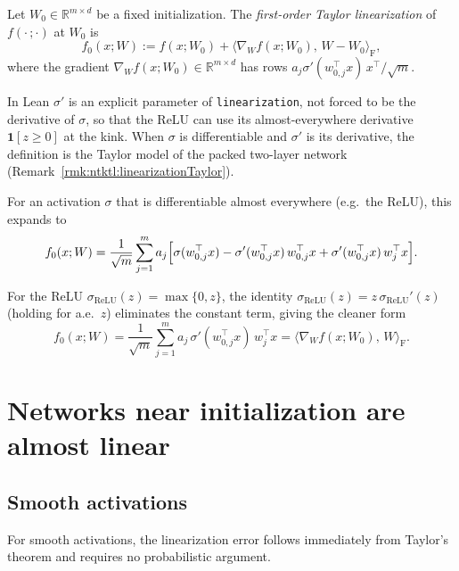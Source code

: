 \begin{definition}\label{def:ntk:linearization}
  \leanok
Let $W_0 \in \mathbb{R}^{m \times d}$ be a fixed initialization.
The \emph{first-order Taylor linearization} of $f(\cdot\,; \cdot)$ at $W_0$ is
\[
  f_0(x; W) :=
    f(x; W_0) + \langle \nabla_W f(x; W_0),\, W - W_0 \rangle_{\mathrm{F}},
\]
where the gradient $\nabla_W f(x; W_0) \in \mathbb{R}^{m \times d}$ has rows
$a_j \sigma'(w_{0,j}^\top x)\, x^\top / \sqrt{m}$.

In Lean $\sigma'$ is an explicit parameter of \texttt{linearization}, not forced to be the
derivative of $\sigma$, so that the ReLU can use its almost-everywhere derivative
$\mathbf 1[z \ge 0]$ at the kink. When $\sigma$ is differentiable and $\sigma'$ is its derivative,
the definition is the Taylor model of the packed two-layer network
(Remark~\ref{rmk:ntktl:linearizationTaylor}).

For an activation $\sigma$ that is differentiable almost everywhere (e.g.\ the ReLU),
this expands to
\[
  f_0(x; W) = \frac{1}{\sqrt{m}} \sum_{j=1}^{m} a_j \Bigl[
    \sigma(w_{0,j}^\top x) - \sigma'(w_{0,j}^\top x)\,w_{0,j}^\top x
    + \sigma'(w_{0,j}^\top x)\,w_j^\top x\Bigr].
\]
\end{definition}

\begin{remark}\label{rmk:ntk:reluLinearization}
For the ReLU $\sigma_{\mathrm{ReLU}}(z) = \max\{0,z\}$, the identity
$\sigma_{\mathrm{ReLU}}(z) = z\,\sigma_{\mathrm{ReLU}}'(z)$ (holding for a.e.\ $z$)
eliminates the constant term, giving the cleaner form
\[
  f_0(x; W) = \frac{1}{\sqrt{m}} \sum_{j=1}^{m} a_j\, \sigma'(w_{0,j}^\top x)\, w_j^\top x
  = \langle \nabla_W f(x; W_0),\, W \rangle_{\mathrm{F}}.
\]
\end{remark}


\section{Networks near initialization are almost linear}\label{sec:ntk:linearization}

\subsection{Smooth activations}

For smooth activations, the linearization error follows immediately from Taylor's theorem
and requires no probabilistic argument.


